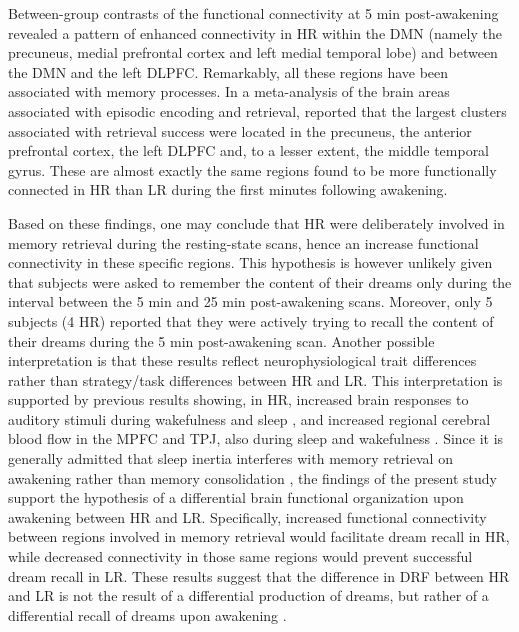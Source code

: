 Between-group contrasts of the functional connectivity at 5 min post-awakening revealed a pattern of enhanced connectivity in HR within the DMN (namely the precuneus, medial prefrontal cortex and left medial temporal lobe) and between the DMN and the left DLPFC. Remarkably, all these regions have been associated with memory processes. In a meta-analysis of the brain areas associated with episodic encoding and retrieval, \citet{spaniol_event-related_2009} reported that the largest clusters associated with retrieval success were located in the precuneus, the anterior prefrontal cortex, the left DLPFC and, to a lesser extent, the middle temporal gyrus. These are almost exactly the same regions found to be more functionally connected in HR than LR during the first minutes following awakening.

Based on these findings, one may conclude that HR were deliberately involved in memory retrieval during the resting-state scans, hence an increase functional connectivity in these specific regions. This hypothesis is however unlikely given that subjects were asked to remember the content of their dreams only during the interval between the 5 min and 25 min post-awakening scans. Moreover, only 5 subjects (4 HR) reported that they were actively trying to recall the content of their dreams during the 5 min post-awakening scan.  Another possible interpretation is that these results reflect neurophysiological trait differences rather than strategy/task differences between HR and LR. This interpretation is supported by previous results showing, in HR, increased brain responses to auditory stimuli during wakefulness and sleep \citep{eichenlaub_brain_2014}, and increased regional cerebral blood flow in the MPFC and TPJ, also during sleep and wakefulness \citep{eichenlaub_resting_2014}. Since it is generally admitted that sleep inertia interferes with memory retrieval on awakening rather than memory consolidation \citep{bonnet_memory_1983, dinges_are_1990, tassi_sleep_2000, conduit_poor_2004}, the findings of the present study support the hypothesis of a differential brain functional organization upon awakening between HR and LR.  Specifically, increased functional connectivity between regions involved in memory retrieval would facilitate dream recall in HR, while decreased connectivity in those same regions would prevent successful dream recall in LR. These results suggest that the difference in DRF between HR and LR is not the result of a differential production of dreams, but rather of a differential recall of dreams upon awakening .

